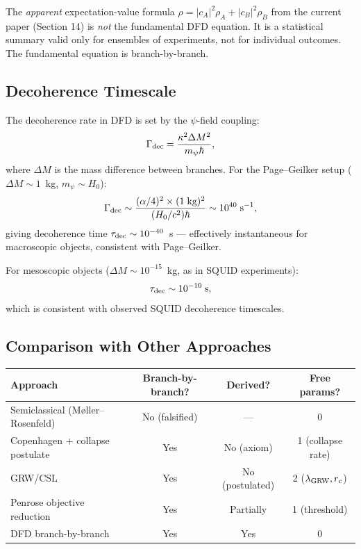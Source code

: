 \documentclass[11pt,a4paper]{article}
\theoremstyle{remark}
\begin{document}
The \emph{apparent} expectation-value formula $\rho = |c_A|^2\rho_A + |c_B|^2\rho_B$
from the current paper (Section 14) is \emph{not} the fundamental DFD equation.
It is a statistical summary valid only for ensembles of experiments, not for
individual outcomes. The fundamental equation is branch-by-branch.

\subsection{Decoherence Timescale}

The decoherence rate in DFD is set by the $\psi$-field coupling:
\begin{equation}
\Gamma_{\rm dec} = \frac{\kappa^2 \Delta M^2}{m_\psi \hbar},
\end{equation}
where $\Delta M$ is the mass difference between branches. For the
Page--Geilker setup ($\Delta M \sim 1$~kg, $m_\psi \sim H_0$):
\begin{equation}
\Gamma_{\rm dec} \sim \frac{(\alpha/4)^2 \times (1\;\text{kg})^2}{(H_0/c^2)\hbar}
\sim 10^{40}\;\text{s}^{-1},
\end{equation}
giving decoherence time $\tau_{\rm dec} \sim 10^{-40}$~s --- effectively
instantaneous for macroscopic objects, consistent with Page--Geilker.

For mesoscopic objects ($\Delta M \sim 10^{-15}$~kg, as in SQUID experiments):
\begin{equation}
\tau_{\rm dec} \sim 10^{-10}\;\text{s},
\end{equation}
which is consistent with observed SQUID decoherence timescales.

\subsection{Comparison with Other Approaches}

\begin{center}
\begin{tabular}{lccc}
\toprule
\textbf{Approach} & \textbf{Branch-by-branch?} & \textbf{Derived?} & \textbf{Free params?} \\
\midrule
Semiclassical (M{\o}ller--Rosenfeld) & No (falsified) & --- & 0 \\
Copenhagen + collapse postulate & Yes & No (axiom) & 1 (collapse rate) \\
GRW/CSL & Yes & No (postulated) & 2 ($\lambda_{\rm GRW}, r_c$) \\
Penrose objective reduction & Yes & Partially & 1 (threshold) \\
DFD branch-by-branch & Yes & Yes & 0 \\
\bottomrule
\end{tabular}
\end{center}
\end{document}
